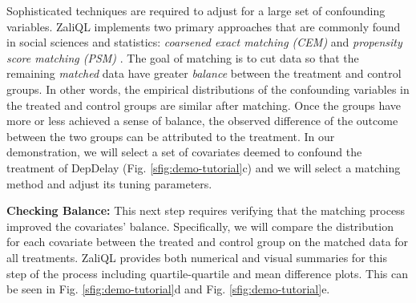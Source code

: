 Sophisticated techniques are required to adjust for a large set of confounding variables. ZaliQL implements two primary approaches that are commonly found in social sciences and statistics: {\em coarsened exact matching (CEM)} and {\em propensity score matching (PSM)} \cite{IacKinPor09,Rubin1983b}. The goal of matching is to cut data so that the remaining {\em matched} data have greater {\em balance} between the treatment and control groups. In other words, the empirical distributions of the confounding variables in the treated and control groups are similar after matching. Once the groups have more or less achieved a sense of balance, the observed difference of the outcome between the two groups can be attributed to the treatment. In our demonstration, we will select a set of covariates deemed to confound the treatment of DepDelay (Fig. \ref{sfig:demo-tutorial}c) and we will select a matching method and adjust its tuning parameters. 

{\bf Checking Balance:} This next step requires verifying that the matching process improved the covariates’ balance. Specifically, we will compare the distribution for each covariate between the treated and control group on the matched data for all treatments. ZaliQL provides both numerical and visual summaries for this step of the process including quartile-quartile and mean difference plots. This can be seen in Fig. \ref{sfig:demo-tutorial}d and Fig. \ref{sfig:demo-tutorial}e. 

